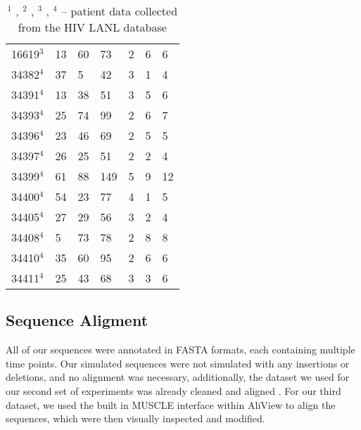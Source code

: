 \begin{table*}[!ht]
\begin{tabularx}{\textwidth}{ X | X | X | X | X | X | X }
16619$^3$ &       13 &       60 &       73 &        2 &        6 &        6  \\ 
34382$^4$ &       37 &        5 &       42 &        3 &        1 &        4  \\ 
34391$^4$ &       13 &       38 &       51 &        3 &        5 &        6  \\ 
34393$^4$ &       25 &       74 &       99 &        2 &        6 &        7  \\ 
34396$^4$ &       23 &       46 &       69 &        2 &        5 &        5 \\ 
34397$^4$ &       26 &       25 &       51 &        2 &        2 &        4  \\ 
34399$^4$ &       61 &       88 &      149 &        5 &        9 &       12  \\ 
34400$^4$ &       54 &       23 &       77 &        4 &        1 &        5  \\ 
34405$^4$ &       27 &       29 &       56 &        3 &        2 &        4  \\ 
34408$^4$ &        5 &       73 &       78 &        2 &        8 &        8 \\ 
34410$^4$ &       35 &       60 &       95 &        2 &        6 &        6 \\ 
34411$^4$ &       25 &       43 &       68 &        3 &        3 &        6   \\ \hline \hline
\end{tabularx}

  \caption{$^1$ \cite{Shankarappa99}, $^2$ \cite{Fischer04}, $^3$ \cite{Llewellyn06},  $^4$ \cite{Novitsky09} --  patient data collected from the HIV LANL database \citep{LosAlamos}}
\end{table*}

\subsection{Sequence Aligment} \label{subsec:seqalign}
All of our sequences were annotated in FASTA formats, each containing multiple time points. Our simulated sequences were not simulated with any insertions or deletions, and no alignment was necessary, additionally, the dataset we used for our second set of experiments was already cleaned and aligned \citep{McCloskey14}. For our third dataset, we used the built in MUSCLE \citep{Muscle04} interface within AliView \citep{AliView14} to align the sequences, which were then visually inspected and modified. 

